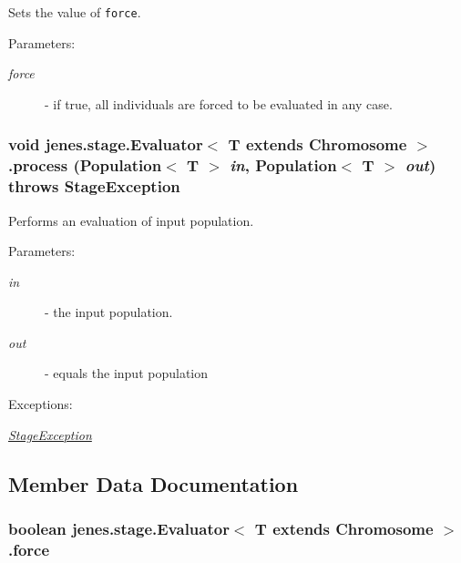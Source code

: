 Sets the value of {\tt force}. \begin{Desc}
\item[Parameters:]
\begin{description}
\item[{\em force}]- if true, all individuals are forced to be evaluated in any case. \end{description}
\end{Desc}
\hypertarget{classjenes_1_1stage_1_1_evaluator_3_01_t_01extends_01_chromosome_01_4_25aee75f7acf2406ca17526f588a8f15}{
\subsubsection[process]{\setlength{\rightskip}{0pt plus 5cm}void jenes.stage.Evaluator$<$ T extends Chromosome $>$.process (Population$<$ T $>$ {\em in}, \/  Population$<$ T $>$ {\em out})  throws {\bf StageException} }}
\label{classjenes_1_1stage_1_1_evaluator_3_01_t_01extends_01_chromosome_01_4_25aee75f7acf2406ca17526f588a8f15}


Performs an evaluation of input population. \begin{Desc}
\item[Parameters:]
\begin{description}
\item[{\em in}]- the input population. \item[{\em out}]- equals the input population \end{description}
\end{Desc}
\begin{Desc}
\item[Exceptions:]
\begin{description}
\item[{\em \hyperlink{classjenes_1_1stage_1_1_stage_exception}{StageException}}]\end{description}
\end{Desc}


\subsection{Member Data Documentation}
\hypertarget{classjenes_1_1stage_1_1_evaluator_3_01_t_01extends_01_chromosome_01_4_8ad6c1bcd555e06450a444d2d18b6b89}{
\subsubsection[force]{\setlength{\rightskip}{0pt plus 5cm}boolean jenes.stage.Evaluator$<$ T extends Chromosome $>$.{\bf force}}}
\label{classjenes_1_1stage_1_1_evaluator_3_01_t_01extends_01_chromosome_01_4_8ad6c1bcd555e06450a444d2d18b6b89}


